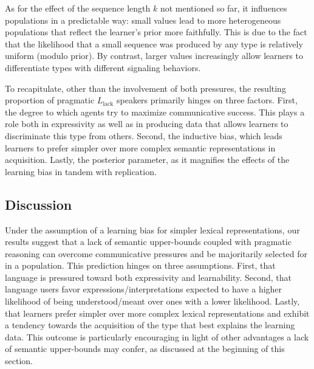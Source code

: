 \documentclass[a4paper, 11pt]{article}
\newcommand{\mylang}[1]{\ensuremath{L_{\text{#1}}}\xspace} %
\newcommand{\Llack}{\mylang{lack}}
\begin{document}
As for the effect of the sequence length $k$ not mentioned so far, it influences populations in a predictable way: small values lead to more heterogeneous populations that reflect the learner's prior more faithfully. This is due to the fact that the likelihood that a small sequence was produced by any type is relatively uniform (modulo prior). By contrast, larger values increasingly allow learners to differentiate types with different signaling behaviors.

To recapitulate, other than the involvement of both pressures, the resulting proportion of pragmatic $\Llack$ speakers primarily hinges on three factors. First, the degree to which agents try to maximize communicative success. This plays a role both in expressivity as well as in producing data that allows learners to discriminate this type from others. Second, the inductive bias, which leads learners to prefer simpler over more complex semantic representations in acquisition. Lastly, the posterior parameter, as it magnifies the effects of the learning bias in tandem with replication. 




\subsection{Discussion}
Under the assumption of a learning bias for simpler lexical representations, our results suggest that a lack of semantic upper-bounds coupled with pragmatic reasoning can overcome communicative pressures and be majoritarily selected for in a population. This prediction hinges on three assumptions. First, that language is pressured toward both expressivity and learnability. Second, that language users favor expressions/interpretations expected to have a higher likelihood of being understood/meant over ones with a lower likelihood. Lastly, that learners prefer simpler over more complex lexical representations and exhibit a tendency towards the acquisition of the type that best explains the learning data. This outcome is particularly encouraging in light of other advantages a lack of semantic upper-bounds may confer, as discussed at the beginning of this section.
\end{document}

